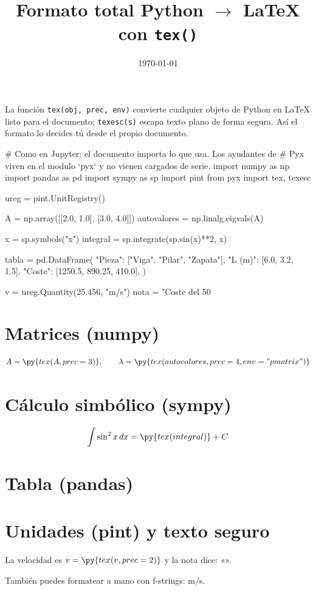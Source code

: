 \documentclass[11pt]{article}
\title{Formato total Python $\to$ \LaTeX{} con \texttt{tex()}}
\author{}
\date{\today}
\begin{document}
\maketitle

La función \verb|tex(obj, prec, env)| convierte cualquier objeto de Python en
\LaTeX{} listo para el documento; \verb|texesc(s)| escapa texto plano de forma
segura. Así el formato lo decides tú desde el propio documento.

# Como en Jupyter: el documento importa lo que usa. Los ayudantes de
# Pyx viven en el modulo `pyx` y no vienen cargados de serie.
import numpy as np
import pandas as pd
import sympy as sp
import pint
from pyx import tex, texesc

ureg = pint.UnitRegistry()

A = np.array([[2.0, 1.0], [3.0, 4.0]])
autovalores = np.linalg.eigvals(A)

x = sp.symbols("x")
integral = sp.integrate(sp.sin(x)**2, x)

tabla = pd.DataFrame({
    "Pieza": ["Viga", "Pilar", "Zapata"],
    "L (m)": [6.0, 3.2, 1.5],
    "Coste": [1250.5, 890.25, 410.0],
})

v = ureg.Quantity(25.456, "m/s")
nota = "Coste del 50%

\section{Matrices (numpy)}
\[ A = \py{tex(A, prec=3)} , \qquad
   \lambda = \py{tex(autovalores, prec=4, env="pmatrix")} \]

\section{Cálculo simbólico (sympy)}
\[ \int \sin^2 x \, dx = \py{tex(integral)} + C \]

\section{Tabla (pandas)}
\begin{center}
\end{center}

\section{Unidades (pint) y texto seguro}
La velocidad es $v = \py{tex(v, prec=2)}$ y la nota dice:
«».

También puedes formatear a mano con f-strings:  m/s.
\end{document}
